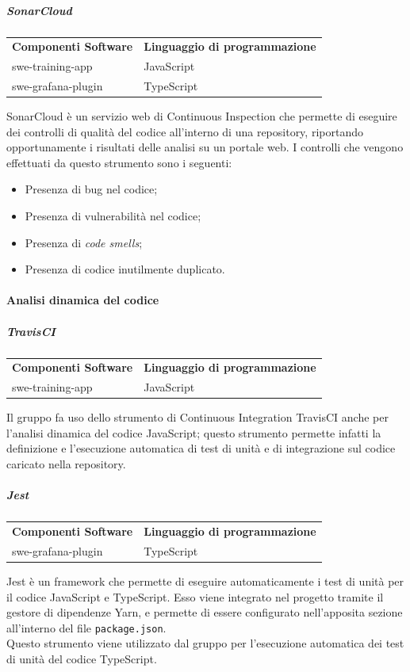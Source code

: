 \documentclass[../norme-di-progetto.tex]{subfiles}
\begin{document}
\subparagraph{SonarCloud}
\begin{table}[H]
\centering
\begin{tabular}{P{8cm}P{8cm}}
  \textbf{Componenti Software}  &  \textbf{Linguaggio di programmazione} \\
  swe-training-app  &   JavaScript \\
  swe-grafana-plugin   &   TypeScript \\
\end{tabular}
\end{table}
SonarCloud è un servizio web di Continuous Inspection che permette di eseguire dei controlli di qualità del codice all'interno di una repository, riportando opportunamente i risultati delle analisi su un portale web. I controlli che vengono effettuati da questo strumento sono i seguenti:
\begin{itemize}
  \item Presenza di bug nel codice;
  \item Presenza di vulnerabilità nel codice;
  \item Presenza di \textit{code smells};
  \item Presenza di codice inutilmente duplicato.
\end{itemize}

\paragraph{Analisi dinamica del codice}
\subparagraph{TravisCI}
\begin{table}[H]
\centering
\begin{tabular}{P{8cm}P{8cm}}
  \textbf{Componenti Software}  &  \textbf{Linguaggio di programmazione} \\
  swe-training-app  &   JavaScript \\
\end{tabular}
\end{table}
Il gruppo fa uso dello strumento di Continuous Integration TravisCI anche per l'analisi dinamica del codice JavaScript; questo strumento permette infatti la definizione e l'esecuzione automatica di test di unità e di integrazione sul codice caricato nella repository.

\subparagraph{Jest}
\begin{table}[H]
\centering
\begin{tabular}{P{8cm}P{8cm}}
  \textbf{Componenti Software}  &  \textbf{Linguaggio di programmazione} \\
  swe-grafana-plugin   &   TypeScript \\
\end{tabular}
\end{table}
Jest è un framework che permette di eseguire automaticamente i test di unità per il codice JavaScript e TypeScript. Esso viene integrato nel progetto tramite il gestore di dipendenze Yarn, e permette di essere configurato nell'apposita sezione all'interno del file \texttt{package.json}. \\
Questo strumento viene utilizzato dal gruppo per l'esecuzione automatica dei test di unità del codice TypeScript.
\end{document}
